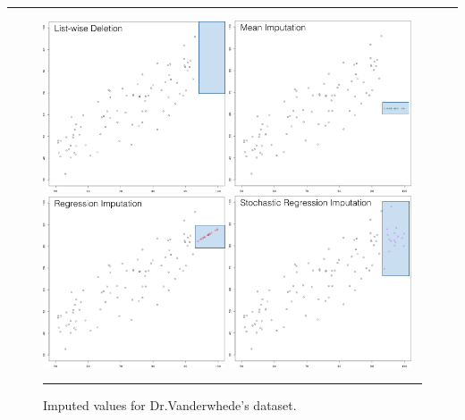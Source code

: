 \begin{center}
    \rule{0.5\linewidth}{.4pt}
\end{center}
\begin{figure}[t]
\centering
\includegraphics[width=0.48\textwidth]{Images/listwisedeletion.png}
\quad
\includegraphics[width=0.48\textwidth]{Images/mean.png} \\
\includegraphics[width=0.48\textwidth]{Images/regression.png} 
\quad
\includegraphics[width=0.48\textwidth]{Images/stochastic.png}
\caption[\small Imputed values for Dr.\@ Vanderwhede's dataset]{\small Imputed values for Dr.\@ Vanderwhede's dataset.}
\label{fig:theimputations}\hrule
\end{figure}
